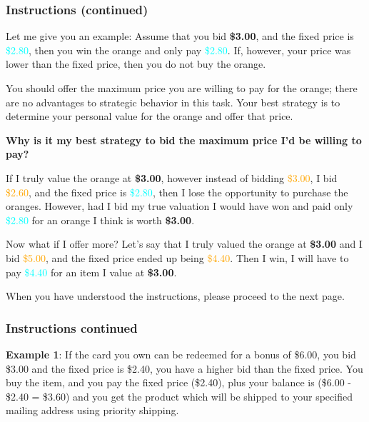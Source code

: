 \documentclass[12pt]{article}
\begin{document}
\clearpage


\subsubsection*{Instructions (continued)}
Let me give you an example: Assume that you bid \textbf{\$3.00}, and the fixed price is \textcolor{cyan}{\$2.80}, then you win the orange and only pay \textcolor{cyan}{\$2.80}. If, however, your price was lower than the fixed price, then you do not buy the orange.  

You should offer the maximum price you are willing to pay for the orange; there are no advantages to strategic behavior in this task. Your best strategy is to determine your personal value for the orange and offer that price.  

\vspace{0.3cm}

\textbf{Why is it my best strategy to bid the maximum price I’d be willing to pay?}  

If I truly value the orange at \textbf{\$3.00}, however instead of bidding \textcolor{orange}{\$3.00}, I bid \textcolor{orange}{\$2.60}, and the fixed price is \textcolor{cyan}{\$2.80}, then I lose the opportunity to purchase the oranges. However, had I bid my true valuation I would have won and paid only \textcolor{cyan}{\$2.80} for an orange I think is worth \textbf{\$3.00}.  

Now what if I offer more? Let’s say that I truly valued the orange at \textbf{\$3.00} and I bid \textcolor{orange}{\$5.00}, and the fixed price ended up being \textcolor{orange}{\$4.40}. Then I win, I will have to pay \textcolor{cyan}{\$4.40} for an item I value at \textbf{\$3.00}.  

\vspace{0.5cm} 

When you have understood the instructions, please proceed to the next page.  


\clearpage


\subsubsection*{Instructions continued}


\textbf{Example 1}: If the card you own can be redeemed for a bonus of \$6.00, you bid \$3.00 and the fixed price is \$2.40, you have a higher bid than the fixed price. You buy the item, and you pay the fixed price (\$2.40), plus your balance is (\$6.00 - \$2.40 = \$3.60) and you get the product which will be shipped to your specified mailing address using priority shipping.
\vspace{0.5cm}
\end{document}
